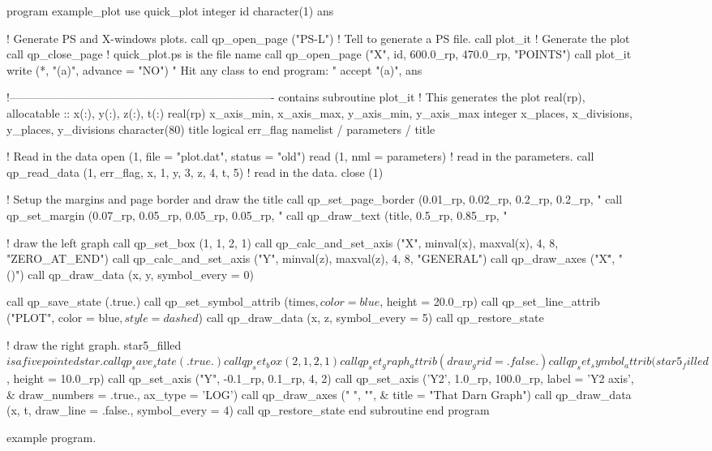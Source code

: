 \begin{figure}
\footnotesize
\begin{listing}{1}
  program example_plot
    use quick_plot
    integer id
    character(1) ans
  
  ! Generate PS and X-windows plots.
    call qp_open_page ("PS-L")  ! Tell \quickplot to generate a PS file.
    call plot_it              ! Generate the plot
    call qp_close_page        ! quick_plot.ps is the file name
    call qp_open_page ("X", id, 600.0_rp, 470.0_rp, "POINTS")
    call plot_it
    write (*, "(a)", advance = "NO") " Hit any class to end program: "
    accept "(a)", ans

  !----------------------------------------------------------------------
  contains
  subroutine plot_it                             ! This generates the plot
    real(rp), allocatable :: x(:), y(:), z(:), t(:)
    real(rp) x_axis_min, x_axis_max, y_axis_min, y_axis_max
    integer x_places, x_divisions, y_places, y_divisions
    character(80) title
    logical err_flag
    namelist / parameters / title

  ! Read in the data
    open (1, file = "plot.dat", status = "old")
    read (1, nml = parameters)                  ! read in the parameters.
    call qp_read_data (1, err_flag, x, 1, y, 3, z, 4, t, 5) ! read in the data.
    close (1)

  ! Setup the margins and page border and draw the title
    call qp_set_page_border (0.01_rp, 0.02_rp, 0.2_rp, 0.2_rp, "%
    call qp_set_margin (0.07_rp, 0.05_rp, 0.05_rp, 0.05_rp, "%
    call qp_draw_text (title, 0.5_rp, 0.85_rp, "%

  ! draw the left graph
    call qp_set_box (1, 1, 2, 1)
    call qp_calc_and_set_axis ("X", minval(x), maxval(x), 4, 8, "ZERO_AT_END")
    call qp_calc_and_set_axis ("Y", minval(z), maxval(z), 4, 8, "GENERAL")
    call qp_draw_axes ("X\dlab\u", "\gb(\A)")
    call qp_draw_data (x, y, symbol_every = 0)

    call qp_save_state (.true.)
    call qp_set_symbol_attrib (times$, color = blue$, height = 20.0_rp)
    call qp_set_line_attrib ("PLOT", color = blue$, style = dashed$)
    call qp_draw_data (x, z, symbol_every = 5)
    call qp_restore_state

  ! draw the right graph. star5_filled$ is a five pointed star.
    call qp_save_state (.true.)
    call qp_set_box (2, 1, 2, 1)
    call qp_set_graph_attrib (draw_grid = .false.)
    call qp_set_symbol_attrib (star5_filled$, height = 10.0_rp)
    call qp_set_axis ("Y", -0.1_rp, 0.1_rp, 4, 2)
    call qp_set_axis ('Y2', 1.0_rp, 100.0_rp, label = 'Y2 axis', &
                                draw_numbers = .true., ax_type = 'LOG')
    call qp_draw_axes ("      ", "\fsLY\fn", &
                                              title = "That Darn Graph")
    call qp_draw_data (x, t, draw_line = .false., symbol_every = 4)
    call qp_restore_state
  end subroutine
  end program
\end{listing}
\caption{\quickplot example program.}
\label{f:plot.example}
\end{figure}


